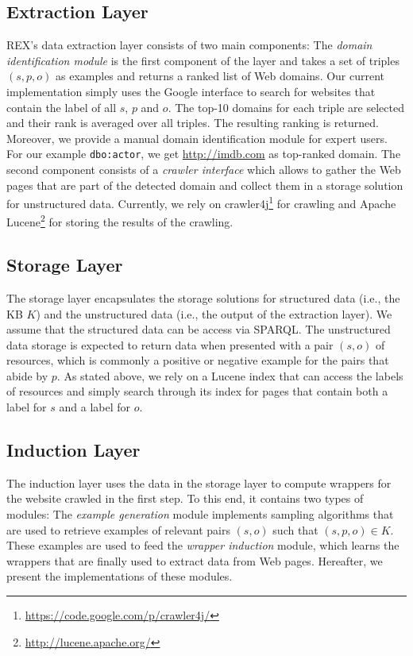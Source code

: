 \subsection{Extraction Layer}
REX's data extraction layer consists of two main components:
The \emph{domain identification module} is the first component of the layer and takes a set of triples $(s, p, o)$ as examples and returns a ranked list of Web domains.
Our current implementation simply uses the Google interface to search for websites that contain the label of all $s$, $p$ and $o$.
The top-10 domains for each triple are selected and their rank is averaged over all triples.
The resulting ranking is returned. 
Moreover, we provide a manual domain identification module for expert users.
For our example \texttt{dbo:actor}, we get \url{http://imdb.com} as top-ranked domain.
The second component consists of a \emph{crawler interface} which allows to gather the Web pages that are part of the detected domain and collect them in a storage solution for unstructured data.
Currently, we rely on crawler4j\footnote{\url{https://code.google.com/p/crawler4j/}} for crawling and Apache Lucene\footnote{\url{http://lucene.apache.org/}} for storing the results of the crawling.  

\subsection{Storage Layer}
The storage layer encapsulates the storage solutions for structured data (i.e., the  \ac{KB} $K$) and the unstructured data (i.e., the output of the extraction layer). 
We assume that the structured data can be access via SPARQL.
The unstructured data storage is expected to return data when presented with a pair $(s, o)$ of resources, which is commonly a positive or negative example for the pairs that abide by $p$.
As stated above, we rely on a Lucene index that can access the labels of resources and simply search through its index for pages that contain both a label for $s$ and a label for $o$.

\subsection{Induction Layer}
The induction layer uses the data in the storage layer to compute wrappers for the website crawled in the first step.
To this end, it contains two types of modules:
The \emph{example generation} module implements sampling algorithms that are used to retrieve examples of relevant pairs $(s, o)$ such that $(s, p, o) \in K$. 
These examples are used to feed the \emph{wrapper induction} module, which learns the wrappers that are finally used to extract data from Web pages.
Hereafter, we present the implementations of these modules.

